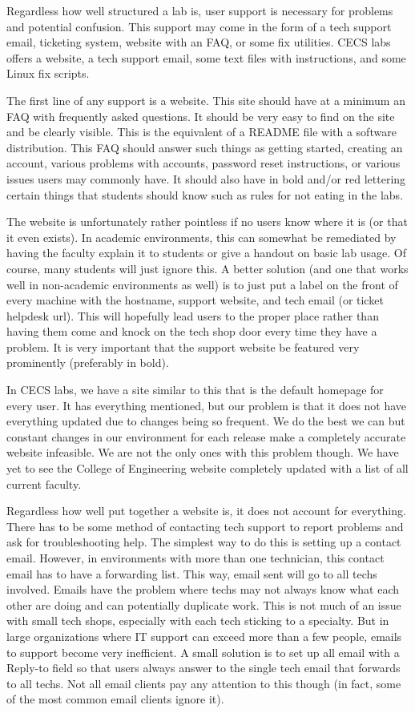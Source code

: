 Regardless how well structured a lab is, user support is necessary for problems and potential confusion.  This support may come in the form of a tech support email, ticketing system, website with an FAQ, or some fix utilities.  CECS labs offers a website, a tech support email, some text files with instructions, and some Linux fix scripts.

The first line of any support is a website.  This site should have at a minimum an FAQ with frequently asked questions.  It should be very easy to find on the site and be clearly visible.  This is the equivalent of a README file with a software distribution.  This FAQ should answer such things as getting started, creating an account, various problems with accounts, password reset instructions, or various issues users may commonly have.  It should also have in bold and/or red lettering certain things that students should know such as rules for not eating in the labs. 

The website is unfortunately rather pointless if no users know where it is (or that it even exists).  In academic environments, this can somewhat be remediated by having the faculty explain it to students or give a handout on basic lab usage.  Of course, many students will just ignore this.  A better solution (and one that works well in non-academic environments as well) is to just put a label on the front of every machine with the hostname, support website, and tech email (or ticket helpdesk url).  This will hopefully lead users to the proper place rather than having them come and knock on the tech shop door every time they have a problem.  It is very important that the support website be featured very prominently (preferably in bold).  

In CECS labs, we have a site similar to this that is the default homepage for every user. It has everything mentioned, but our problem is that it does not have everything updated due to changes being so frequent. We do the best we can but constant changes in our environment for each release make a completely accurate website infeasible. We are not the only ones with this problem though. We have yet to see the College of Engineering website completely updated with a list of all current faculty.  

Regardless how well put together a website is, it does not account for everything.  There has to be some method of contacting tech support to report problems and ask for troubleshooting help.  The simplest way to do this is setting up a contact email.  However, in environments with more than one technician, this contact email has to have a forwarding list.  This way, email sent will go to all techs involved.   Emails have the problem where techs may not always know what each other are doing and can potentially duplicate work.  This is not much of an issue with small tech shops, especially with each tech sticking to a specialty.  But in large organizations where IT support can exceed more than a few people, emails to support become very inefficient.  A small solution is to set up all email with a Reply-to field so that users always answer to the single tech email that forwards to all techs.  Not all email clients pay any attention to this though (in fact, some of the most common email clients ignore it).

